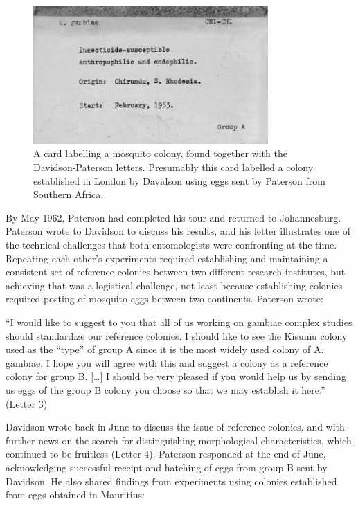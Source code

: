 \documentclass[a4paper,11pt,abstracton,hidelinks]{scrartcl}
\begin{document}
\begin{figure}[t]
\centering
\includegraphics[width=0.8\textwidth]{davidson-letters/Cards-colonies.pdf}
\caption{A card labelling a mosquito colony, found together with the Davidson-Paterson letters. Presumably this card labelled a colony established in London by Davidson using eggs sent by Paterson from Southern Africa.}
\label{fig:colony-cards}
\end{figure}


By May 1962, Paterson had completed his tour and returned to Johannesburg.
%
Paterson wrote to Davidson to discuss his results, and his letter illustrates one of the technical challenges that both entomologists were confronting at the time.
%
Repeating each other's experiments required establishing and maintaining a consistent set of reference colonies between two different research institutes, but achieving that was a logistical challenge, not least because establishing colonies required posting of mosquito eggs between two continents.
%
Paterson wrote:


\begin{displayquote}
``I would like to suggest to you that all of us working on gambiae complex studies should standardize our reference colonies. I should like to see the Kisumu colony used as the ``type'' of group A since it is the most widely used colony of A. gambiae. I hope you will agree with this and suggest a colony as a reference colony for group B. [\ldots] I should be very pleased if you would help us by sending us eggs of the group B colony you choose so that we may establish it here.'' (Letter 3)
\end{displayquote}


Davidson wrote back in June to discuss the issue of reference colonies, and with further news on the search for distinguishing morphological characteristics, which continued to be fruitless (Letter 4).
%
Paterson responded at the end of June, acknowledging successful receipt and hatching of eggs from group B sent by Davidson.
%
He also shared findings from experiments using colonies established from eggs obtained in Mauritius:
\end{document}

